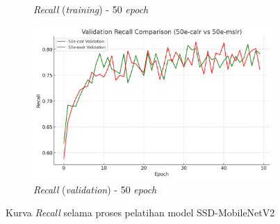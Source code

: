 \begin{figure}[htbp]
\begin{subfigure}{0.45\textwidth}
    \caption{\emph{Recall} (\emph{training}) - 50 \emph{epoch}}
  \end{subfigure}
  \hfill
  \begin{subfigure}{0.45\textwidth}
    \includegraphics[width=\textwidth]{gambar/bab4-val-recall-50e.png}
    \caption{\emph{Recall} (\emph{validation}) - 50 \emph{epoch}}
  \end{subfigure}
  \caption{Kurva \emph{Recall} selama proses pelatihan model SSD-MobileNetV2}
  \label{fig:recall_curves}
\end{figure}

